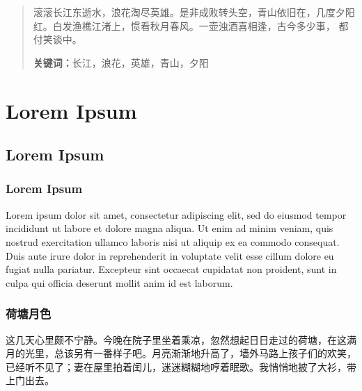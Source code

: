 \documentclass[twoside, UTF8, a4paper]{ctexart}
\numberwithin{figure}{section}
\numberwithin{table}{section}
\numberwithin{equation}{section}
\begin{document}

\thispagestyle{empty}
\vspace*{15mm}
\begin{abstract}
滚滚长江东逝水，浪花淘尽英雄。是非成败转头空，青山依旧在，几度夕阳红。白发渔樵江渚上，惯看秋月春风。一壶浊酒喜相逢，古今多少事， 都付笑谈中。

\noindent \textbf{关键词：}长江，浪花，英雄，青山，夕阳
\end{abstract}
\restoregeometry


\setcounter{tocdepth}{3}
\tableofcontents


\clearpage
\pagestyle{fancy}
\fancyhf{}
\renewcommand{\headrulewidth}{0.3pt}
\fancyhead[LE]{\leftmark}
\fancyfoot[CF]{\thepage}
\setcounter{page}{1}

\section{Lorem Ipsum}
\subsection{Lorem Ipsum}
\subsubsection{Lorem Ipsum}

Lorem ipsum dolor sit amet, consectetur adipiscing elit, sed do eiusmod tempor incididunt ut labore et dolore magna aliqua. Ut enim ad minim veniam, quis nostrud exercitation ullamco laboris nisi ut aliquip ex ea commodo consequat. Duis aute irure dolor in reprehenderit in voluptate velit esse cillum dolore eu fugiat nulla pariatur. Excepteur sint occaecat cupidatat non proident, sunt in culpa qui officia deserunt mollit anim id est laborum.

\subsubsection{荷塘月色}

这几天心里颇不宁静。今晚在院子里坐着乘凉，忽然想起日日走过的荷塘，在这满月的光里，总该另有一番样子吧。月亮渐渐地升高了，墙外马路上孩子们的欢笑，已经听不见了；妻在屋里拍着闰儿，迷迷糊糊地哼着眠歌。我悄悄地披了大衫，带上门出去。
\end{document}
